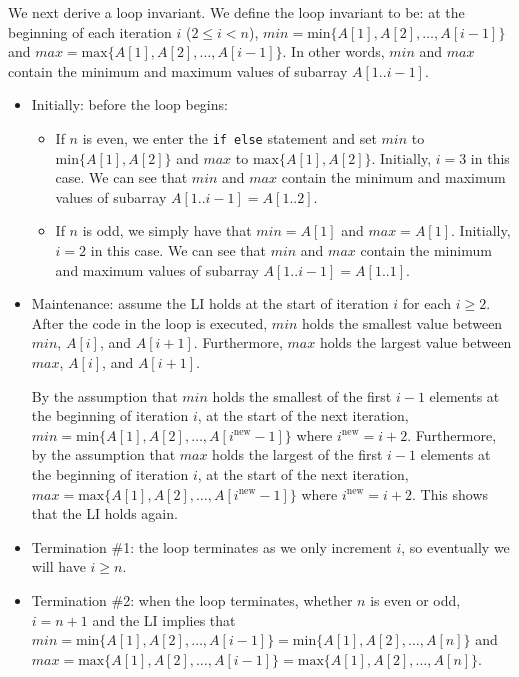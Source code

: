 \documentclass[11pt, letterpaper, titlepage]{article}
\begin{document}
We next derive a loop invariant. We define the loop invariant to be: at the beginning of each iteration $i$ ($2 \leq i < n$), $min = \text{min}\{ A[1], A[2], \ldots, A[i - 1] \}$ and $max = \text{max}\{ A[1], A[2], \ldots, A[i - 1] \}$. In other words, $min$ and $max$ contain the minimum and maximum values of subarray $A[1..i-1]$.
\begin{itemize}
    \item Initially: before the loop begins:
    \begin{itemize}
        \item If $n$ is even, we enter the \lstinline{if else} statement and set $min$ to $\text{min}\{ A[1], A[2] \}$ and $max$ to $\text{max}\{ A[1], A[2] \}$. Initially, $i = 3$ in this case. We can see that $min$ and $max$ contain the minimum and maximum values of subarray $A[1..i-1] = A[1..2]$.
        \item If $n$ is odd, we simply have that $min = A[1]$ and $max = A[1]$. Initially, $i = 2$ in this case. We can see that $min$ and $max$ contain the minimum and maximum values of subarray $A[1..i-1] = A[1..1]$.
    \end{itemize}
    \item Maintenance: assume the LI holds at the start of iteration $i$ for each $i \geq 2$. After the code in the loop is executed, $min$ holds the smallest value between $min$, $A[i]$, and $A[i + 1]$. Furthermore, $max$ holds the largest value between $max$, $A[i]$, and $A[i + 1]$. 
    
    By the assumption that $min$ holds the smallest of the first $i - 1$ elements at the beginning of iteration $i$, at the start of the next iteration, $min = \text{min}\{ A[1], A[2], \ldots, A[i^\text{new} - 1] \}$ where $i^\text{new} = i + 2$. Furthermore, by the assumption that $max$ holds the largest of the first $i - 1$ elements at the beginning of iteration $i$, at the start of the next iteration, $max = \text{max}\{ A[1], A[2], \ldots, A[i^\text{new} - 1] \}$ where $i^\text{new} = i + 2$. This shows that the LI holds again.
    \item Termination \#1: the loop terminates as we only increment $i$, so eventually we will have $i \geq n$.
    \item Termination \#2: when the loop terminates, whether $n$ is even or odd, $i = n + 1$ and the LI implies that $min = \text{min}\{ A[1], A[2], \ldots, A[i - 1] \} = \text{min}\{ A[1], A[2], \ldots, A[n] \}$ and $max = \text{max}\{ A[1], A[2], \ldots, A[i - 1] \} = \text{max}\{ A[1], A[2], \ldots, A[n] \}$.
\end{itemize}
\end{document}
